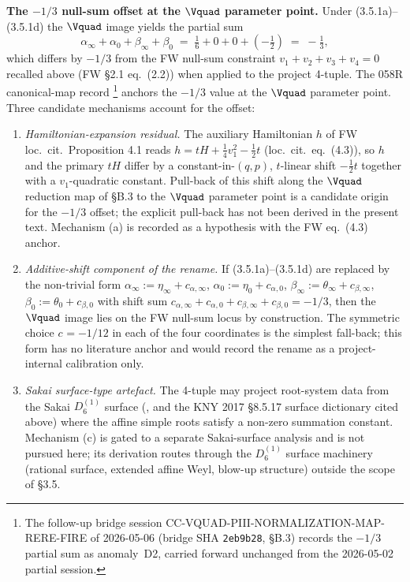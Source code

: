 \medskip
\noindent\textbf{The $-1/3$ null-sum offset at the $\Vquad$
parameter point.}\hspace{0.5em}
Under (3.5.1a)--(3.5.1d) the $\Vquad$ image yields the partial
sum
\[
  \alpha_\infty + \alpha_0 + \beta_\infty + \beta_0
  \;=\; \tfrac{1}{6} + 0 + 0 + (-\tfrac{1}{2})
  \;=\; -\tfrac{1}{3},
\]
which differs by $-1/3$ from the FW null-sum constraint
$v_1 + v_2 + v_3 + v_4 = 0$ recalled above (FW \S 2.1
eq.\ (2.2)) when applied to the project 4-tuple. The 058R
canonical-map record \cite{siarc_cc_pipeline_g}\footnote{The
follow-up bridge session
{\rm CC-VQUAD-PIII-NORMALIZATION-MAP-RERE-FIRE} of
2026-05-06 (bridge SHA \texttt{2eb9b28}, \S B.3) records the
$-1/3$ partial sum as anomaly~D2, carried forward unchanged
from the 2026-05-02 partial session.} anchors the $-1/3$ value
at the $\Vquad$ parameter point. Three candidate mechanisms
account for the offset:
\begin{enumerate}[label=(\alph*)]
\item {\em Hamiltonian-expansion residual.}\hspace{0.5em}
The auxiliary Hamiltonian $h$ of FW loc.\ cit.\ Proposition 4.1
reads $h = t H + \tfrac{1}{4} v_1^{2} - \tfrac{1}{2} t$
(loc.\ cit.\ eq.\ (4.3)), so $h$ and the primary $t H$ differ
by a constant-in-$(q, p)$, $t$-linear shift $-\tfrac{1}{2} t$
together with a $v_1$-quadratic constant. Pull-back of this
shift along the $\Vquad$ reduction map of
\cite{siarc_cc_pipeline_g} \S B.3 to the $\Vquad$ parameter
point is a candidate origin for the $-1/3$ offset; the
explicit pull-back has not been derived in the present text.
Mechanism (a) is recorded as a hypothesis with the FW
eq.\ (4.3) anchor.
\item {\em Additive-shift component of the rename.}\hspace{0.5em}
If (3.5.1a)--(3.5.1d) are replaced by the non-trivial form
$\alpha_\infty := \eta_\infty + c_{\alpha,\infty}$,
$\alpha_0 := \eta_0 + c_{\alpha,0}$,
$\beta_\infty := \theta_\infty + c_{\beta,\infty}$,
$\beta_0 := \theta_0 + c_{\beta,0}$ with shift sum
$c_{\alpha,\infty} + c_{\alpha,0} + c_{\beta,\infty}
+ c_{\beta,0} = -1/3$, then the $\Vquad$ image lies on the FW
null-sum locus by construction. The symmetric choice $c_{} =
-1/12$ in each of the four coordinates is the simplest
fall-back; this form has no literature anchor and would record
the rename as a project-internal calibration only.
\item {\em Sakai surface-type artefact.}\hspace{0.5em}
The 4-tuple may project root-system data from the Sakai
$D_6^{(1)}$ surface (\cite{ohyama2006studies,
noumiyamada1998painleve}, and the KNY 2017 \S 8.5.17 surface
dictionary cited above) where the affine simple roots satisfy
a non-zero summation constant. Mechanism (c) is gated to a
separate Sakai-surface analysis and is not pursued here; its
derivation routes through the $D_6^{(1)}$ surface machinery
(rational surface, extended affine Weyl, blow-up structure)
outside the scope of \S 3.5.
\end{enumerate}
